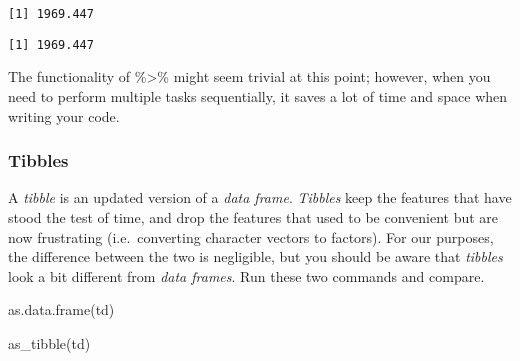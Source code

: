 \documentclass[
  12pt,
  letterpaper]{article}
\newenvironment{Shaded}{\begin{snugshade}}{\end{snugshade}}
\newcommand{\CommentTok}[1]{\textcolor[rgb]{0.37,0.37,0.37}{#1}}
\newcommand{\FunctionTok}[1]{\textcolor[rgb]{0.28,0.35,0.67}{#1}}
\newcommand{\NormalTok}[1]{\textcolor[rgb]{0.00,0.23,0.31}{#1}}
\newcommand{\SpecialCharTok}[1]{\textcolor[rgb]{0.37,0.37,0.37}{#1}}
\renewcommand\texttt[1]{{\ttfamily\color{BrickRed}#1}}
\begin{document}
\begin{Shaded}
\end{Shaded}

\begin{verbatim}
[1] 1969.447
\end{verbatim}

\begin{Shaded}
\end{Shaded}

\begin{verbatim}
[1] 1969.447
\end{verbatim}

The functionality of \texttt{\%\textgreater{}\%} might seem trivial at
this point; however, when you need to perform multiple tasks
sequentially, it saves a lot of time and space when writing your code.

\hypertarget{tibbles}{%
\subsubsection{Tibbles}\label{tibbles}}

A \emph{tibble} is an updated version of a \emph{data frame}.
\emph{Tibbles} keep the features that have stood the test of time, and
drop the features that used to be convenient but are now frustrating
(i.e.~converting character vectors to factors). For our purposes, the
difference between the two is negligible, but you should be aware that
\emph{tibbles} look a bit different from \emph{data frames}. Run these
two commands and compare.

\begin{Shaded}
\begin{Highlighting}[]
\FunctionTok{as.data.frame}\NormalTok{(td)}
\end{Highlighting}
\end{Shaded}

\begin{Shaded}
\begin{Highlighting}[]
\FunctionTok{as\_tibble}\NormalTok{(td)}
\end{Highlighting}
\end{Shaded}
\end{document}
